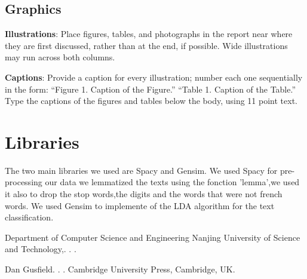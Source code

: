 \documentclass[11pt]{article}
\begin{document}
\label{sect:pdf}

\subsection{Graphics}

{\bf Illustrations}: Place figures, tables, and photographs in the
report near where they are first discussed, rather than at the end, if
possible.  Wide illustrations may run across both columns.

{\bf Captions}: Provide a caption for every illustration; number each one
sequentially in the form:  ``Figure 1. Caption of the Figure.'' ``Table 1.
Caption of the Table.''  Type the captions of the figures and 
tables below the body, using 11 point text.
\section{Libraries}
The two main libraries we used are Spacy and Gensim.
We used Spacy for pre-processing our data we lemmatized the texts using the fonction 'lemma',we used it also to drop the stop words,the digits and the words that were not french words.
We used Gensim to implemente of the LDA algorithm for the text classification.


\begin{thebibliography}{}

Department of Computer Science and Engineering Nanjing University of Science and Technology,.
.
.


Dan Gusfield.
.
.
\newblock Cambridge University Press, Cambridge, UK.

\end{thebibliography}
\end{document}
